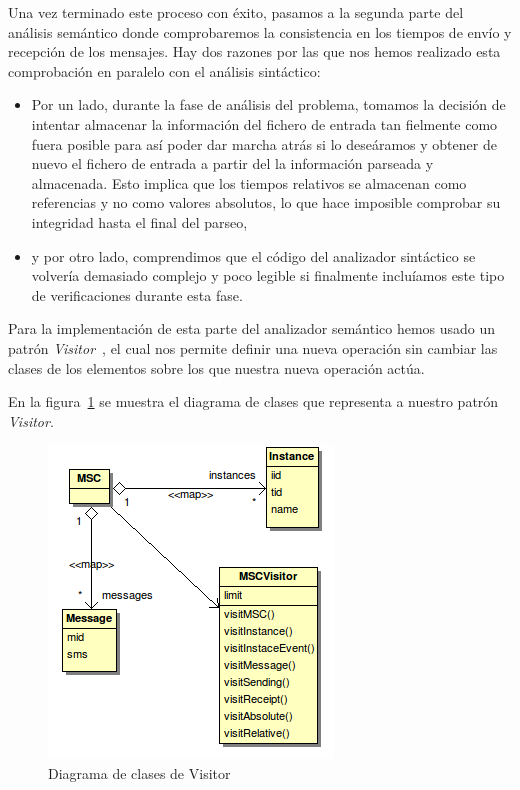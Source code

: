 Una vez terminado este proceso con éxito, pasamos a la segunda parte
del análisis semántico donde comprobaremos la consistencia en los
tiempos de envío y recepción de los mensajes. Hay dos razones por las
que nos hemos realizado esta comprobación en paralelo con el análisis
sintáctico:
\begin{itemize}
\item Por un lado, durante la fase de análisis del problema, tomamos
  la decisión de intentar almacenar la información del fichero de
  entrada tan fielmente como fuera posible para así poder dar marcha
  atrás si lo deseáramos y obtener de nuevo el fichero de entrada a
  partir del la información parseada y almacenada. Esto implica que
  los tiempos relativos se almacenan como referencias y no como
  valores absolutos, lo que hace imposible comprobar su integridad
  hasta el final del parseo,
\item y por otro lado, comprendimos que el código del analizador
  sintáctico se volvería demasiado complejo y poco legible si
  finalmente incluíamos este tipo de verificaciones durante esta fase.
\end{itemize}

Para la implementación de esta parte del analizador semántico hemos
usado un patrón \textit{Visitor}~\cite{gof}, el cual nos permite
definir una nueva operación sin cambiar las clases de los elementos
sobre los que nuestra nueva operación actúa.

En la figura~\ref{fig:fig6} se muestra el diagrama de clases que
representa a nuestro patrón \textit{Visitor}.

\begin{figure}
  \centering 
  \includegraphics[scale=0.7]{./images/diag_visitor.png}
  \caption{Diagrama de clases de Visitor}
  \label{fig:fig6}
\end{figure}

